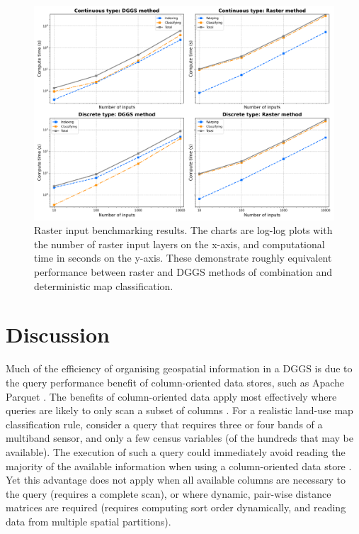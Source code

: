 \documentclass[]{interact}
\theoremstyle{plain}%
\theoremstyle{definition}
\theoremstyle{remark}
\begin{document}
\begin{figure}[t]
    \centering
    \includegraphics[width=0.85\linewidth]{images/raster-results.png}
    \caption{Raster input benchmarking results. The charts are log-log plots with the number of raster input layers on the x-axis, and computational time in seconds on the y-axis. These demonstrate roughly equivalent performance between raster and \ac{DGGS} methods of combination and deterministic map classification.}
    \label{fig:BenchmarkRast}
\end{figure}

\section{Discussion}

Much of the efficiency of organising geospatial information in a \ac{DGGS} is due to the query performance benefit of column-oriented data stores, such as Apache Parquet \citep{abadi2008column,ivanov2020impact}. The benefits of column-oriented data apply most effectively where queries are likely to only scan a subset of columns \citep{abadi2008query}. For a realistic land-use map classification rule, consider a query that requires three or four bands of a multiband sensor, and only a few census variables (of the hundreds that may be available). The execution of such a query could immediately avoid reading the majority of the available information when using a column-oriented data store \citep[pp.~232--238]{abadi2013design}. Yet this advantage does not apply when all available columns are necessary to the query (requires a complete scan), or where dynamic, pair-wise distance matrices are required (requires computing sort order dynamically, and reading data from multiple spatial partitions).
\end{document}
